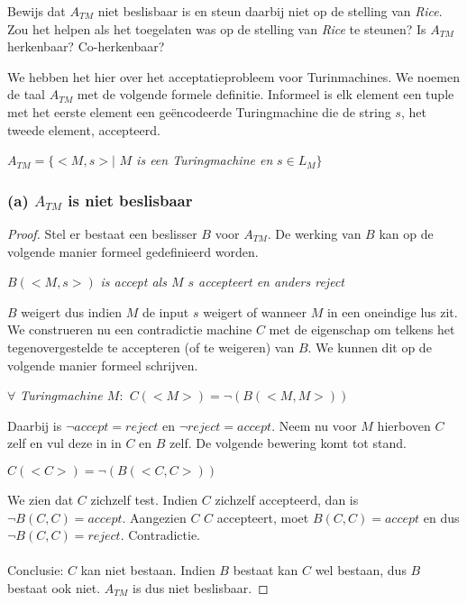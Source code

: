 \begin{question}
	Bewijs dat $A_{TM}$ niet beslisbaar is en steun daarbij niet op de stelling van \textit{Rice}. Zou het helpen als het toegelaten was op de stelling van \textit{Rice} te steunen? Is $A_{TM}$ herkenbaar? Co-herkenbaar?
\end{question}

We hebben het hier over het acceptatieprobleem voor Turinmachines. We noemen de taal $A_{TM}$ met de volgende formele definitie. Informeel is elk element een tuple met het eerste element een ge\"encodeerde Turingmachine die de string $s$, het tweede element, accepteerd.
\begin{center}
	$A_{TM} = \{ <M,s> |$ \textit{$M$ is een Turingmachine en} $ s \in L_M\}$
\end{center}

\subsubsection*{(a) $A_{TM}$ is niet beslisbaar}
\begin{proof}
	Stel er bestaat een beslisser $B$ voor $A_{TM}$. De werking van $B$ kan op de volgende manier formeel gedefinieerd worden.
	
	\begin{pushcenter}
		$B(<M,s>)$ \textit{is accept als $M$ $s$ accepteert en anders reject}
	\end{pushcenter}
	
	$B$ weigert dus indien $M$ de input $s$ weigert of wanneer $M$ in een oneindige lus zit.
	We construeren nu een contradictie machine $C$ met de eigenschap om telkens het tegenovergestelde te accepteren (of te weigeren) van $B$. We kunnen dit op de volgende manier formeel schrijven.
	
	\begin{pushcenter}
		$\forall$ \textit{Turingmachine $M:$ $C(<M>) = \neg (B(<M,M>))$}
	\end{pushcenter}
	
	Daarbij is $\neg accept = reject$ en $\neg reject = accept$.  Neem nu voor $M$ hierboven $C$ zelf en vul deze in in $C$ en $B$ zelf. De volgende bewering komt tot stand.
	
	\begin{pushcenter}
		$C(<C>) = \neg (B(<C,C>))$
	\end{pushcenter}		
	
	We zien dat $C$ zichzelf test. Indien $C$ zichzelf accepteerd, dan is $\neg B(C,C) = accept$. Aangezien $C$ $C$ accepteert, moet $B(C,C) = accept$ en dus $\neg B(C,C) = reject$. Contradictie.
	\\\\
	Conclusie: $C$ kan niet bestaan. Indien $B$ bestaat kan $C$ wel bestaan, dus $B$ bestaat ook niet. $A_{TM}$ is dus niet beslisbaar.
\end{proof} 

